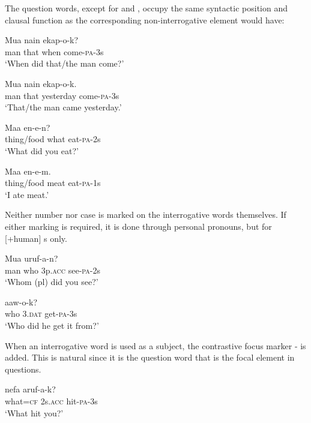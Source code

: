 The question words, except for  and , occupy the same syntactic position and clausal function as the corresponding non-interrogative element would have:

\ea%
\label{ex:x520}
\gll Mua nain  ekap-o-k? \\
man that when come-\textsc{pa}-3s\\
\glt`When did that/the man come?'
\z

\ea%
\label{ex:x647}
\gll Mua nain  ekap-o-k. \\
man that yesterday come-\textsc{pa}-3s\\
\glt`That/the man came yesterday.'
\z

\ea%
\label{ex:x521}
\gll Maa  en-e-n? \\
thing/food what eat-\textsc{pa}-2s\\
\glt`What did you eat?'
\z

\ea%
\label{ex:x648}
\gll Maa  en-e-m. \\
thing/food meat eat-\textsc{pa}-1s\\
\glt`I ate meat.'
\z

Neither number nor case is marked on the interrogative words themselves. If either marking is required, it is done through personal pronouns, but for [+human] s only.

\ea%
\label{ex:x522}
\gll Mua   uruf-a-n? \\
man who 3p.\textsc{acc} see-\textsc{pa}-2s\\
\glt`Whom (pl) did you see?'
\z

\ea%
\label{ex:x523}
\gll {}  aaw-o-k? \\
who 3.\textsc{dat} get-\textsc{pa}-3s\\
\glt`Who did he get it from?'
\z

When an interrogative word is used as a subject, the contrastive focus marker \nobreakdash- is added. This is natural since it is the question word that is the focal element in questions. 

\ea%
\label{ex:x524}
\gll {} nefa aruf-a-k? \\
what=\textsc{cf} 2s.\textsc{acc} hit-\textsc{pa}-3s\\
\glt`What hit you?'
\z

